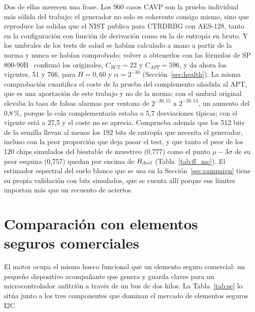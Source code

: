 Dos de ellas merecen una frase. Los 960 casos \ac{CAVP} son la prueba
individual más sólida del trabajo: el generador no solo es coherente
consigo mismo, sino que reproduce las salidas que el \ac{NIST} publica
para \ac{CTRDRBG} con AES-128, tanto en la configuración con función de
derivación como en la de entropía en bruto. Y los umbrales de los tests de
salud se habían calculado a mano a partir de la norma y nunca se habían
comprobado; volver a obtenerlos con las fórmulas de SP
800-90B~\cite{turan_2018_sp80090b} confirmó los originales,
$C_{RCT} = 22$ y $C_{APT} = 596$, y da ahora los vigentes, 51 y 766, para
$H = 0{,}60$ y $\alpha = 2^{-30}$ (Sección~\ref{sec:health}). La misma
comprobación cuantifica el coste de la prueba del complemento añadida al
\ac{APT}, que es una aportación de este trabajo y no de la norma: con el
umbral original elevaba la tasa de falsas alarmas por ventana de
$2^{-20{,}15}$ a $2^{-20{,}14}$, un aumento del 0,8\,\%, porque la cola
complementaria estaba a 5,7 desviaciones típicas; con el vigente está a
27,5 y el coste no se aprecia. Comprueba además que los 512 bits de la
semilla llevan al menos los 192 bits de entropía que necesita el
generador, incluso con la peor proporción que deja pasar el test, y que
tanto el peor de los 120 chips simulados del biestable de muestreo
(0,777) como el punto $\mu - 3\sigma$ de su peor esquina (0,757) quedan
por encima de $H_{\mathrm{decl}}$ (Tabla~\ref{tab:ff_mc}). El estimador espectral del
suelo blanco que se usa en la Sección~\ref{sec:campaign} tiene su propia
validación con bits simulados, que se cuenta allí porque sus límites
importan más que un recuento de aciertos.

\section{Comparación con elementos seguros comerciales}
\label{sec:se_comparison}

El motor ocupa el mismo hueco funcional que un elemento seguro comercial:
un pequeño dispositivo acompañante que genera y guarda claves para un
microcontrolador anfitrión a través de un bus de dos hilos. La
Tabla~\ref{tab:se} lo sitúa junto a los tres componentes que dominan el
mercado de elementos seguros \ac{I2C}.

